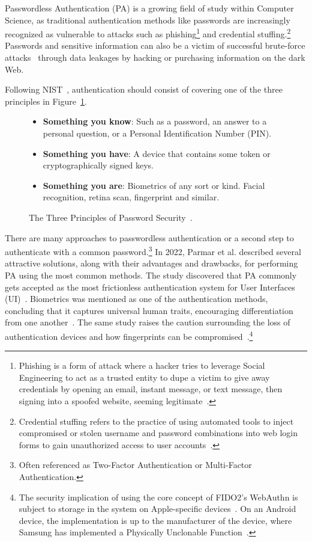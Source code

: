 Passwordless Authentication (PA) is a growing field of study within Computer
Science, as traditional authentication methods like passwords are increasingly
recognized as vulnerable to attacks such as phishing\footnote{
  Phishing is a form of attack where a hacker tries to leverage Social
  Engineering to act as a trusted entity to dupe a victim to give away
  credentials by opening an email, instant message, or text message, then
  signing into a spoofed website, seeming legitimate~\cite{ripa2021emergence}.
} and credential stuffing.\footnote{
  Credential stuffing refers to the practice of using automated tools to
  inject compromised or stolen username and password combinations into web login
  forms to gain unauthorized access to user accounts~\cite{owasp-credential-stuffing}.
}
Passwords and sensitive information can also be a victim of successful
brute-force attacks~\cite{bonneau2012science} through data leakages by hacking
or purchasing information on the dark Web.

Following NIST~\cite{NIST:SP:800-171r2, NISTSP800-63-3}, authentication should
consist of covering one of the three principles in
Figure~\ref{fig:secprinciples}.

\begin{figure}[htbp]
  \begin{itemize}
    \item \textbf{Something you know}:
    Such as a password, an answer to a personal question, or a Personal
    Identification Number (PIN).
    \item \textbf{Something you have}:
    A device that contains some token or cryptographically signed keys.
    \item \textbf{Something you are}:
    Biometrics of any sort or kind.
    Facial recognition, retina scan, fingerprint and similar.
  \end{itemize}
  \caption{The Three Principles of Password Security~\cite{schneier2000secrets, NIST:SP:800-171r2}.}
  \label{fig:secprinciples}
\end{figure}

There are many approaches to passwordless authentication or a second
step to authenticate with a common password.\footnote{
  Often referenced as Two-Factor Authentication or Multi-Factor Authentication.
}
In 2022, Parmar et al.\cite{parmar2022} described several attractive solutions, along with their advantages and drawbacks, for performing PA using the most common methods.
The study discovered that PA commonly gets accepted as the most frictionless authentication system for User Interfaces (UI)~\cite{parmar2022}.
Biometrics was mentioned as one of the authentication methods, concluding that it captures universal human traits, encouraging differentiation from one another~\cite{parmar2022}.
The same study raises the caution surrounding the loss of authentication devices and how fingerprints can be compromised~\cite{parmar2022}.\footnote{
  The security implication of using the core concept of FIDO2's WebAuthn is subject to storage in the system on Apple-specific devices~\cite{appleSecureEnclave}.
  On an Android device, the implementation is up to the manufacturer of the device, where Samsung has implemented a Physically Unclonable
  Function~\cite{lee2021samsung}.
}

